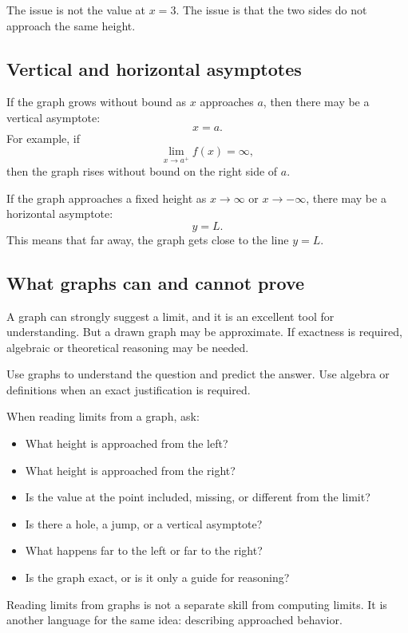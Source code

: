 The issue is not the value at \(x=3\). The issue is that the two sides do not approach the same height.

\subsection*{Vertical and horizontal asymptotes}

If the graph grows without bound as \(x\) approaches \(a\), then there may be a vertical asymptote:
\[
x=a.
\]
For example, if
\[
\lim_{x\to a^+}f(x)=\infty,
\]
then the graph rises without bound on the right side of \(a\).

If the graph approaches a fixed height as \(x\to\infty\) or \(x\to-\infty\), there may be a horizontal asymptote:
\[
y=L.
\]
This means that far away, the graph gets close to the line \(y=L\).

\subsection*{What graphs can and cannot prove}

A graph can strongly suggest a limit, and it is an excellent tool for understanding. But a drawn graph may be approximate. If exactness is required, algebraic or theoretical reasoning may be needed.

\begin{remarkbox}
Use graphs to understand the question and predict the answer. Use algebra or definitions when an exact justification is required.
\end{remarkbox}

\begin{summarybox}
When reading limits from a graph, ask:
\begin{itemize}
\item What height is approached from the left?
\item What height is approached from the right?
\item Is the value at the point included, missing, or different from the limit?
\item Is there a hole, a jump, or a vertical asymptote?
\item What happens far to the left or far to the right?
\item Is the graph exact, or is it only a guide for reasoning?
\end{itemize}
\end{summarybox}

Reading limits from graphs is not a separate skill from computing limits. It is another language for the same idea: describing approached behavior.